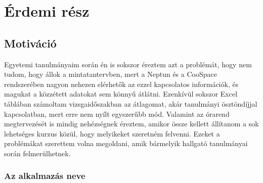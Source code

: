 \documentclass[a4paper,12pt]{report}
\begin{document}
\begin{abstract}
    [téma megnevezése]

    Célom egy olyan alkalmazás elkészítése volt, mely nagyban meg tudja könnyíteni az egyetemi hallgatók számára tanulmányaik követését mindennapjaik során. Ehhez az Angular nevű TypeScript keretrendszert választottam, mert ideálisnak tartom nagy alkalmazások elkészítéséhez, melyek sok, jól elkülöníthető részre tagozódnak, és összetett adatfolyamokkal dolgoznak. Ezen kívül hangsúlyt fektettem rá, hogy ne csak a Szegedi Tudományegyetem hallgatóira szabjam az alkalmazást, hanem általánossá tegyem, hogy az egész országban, de akár potenciálisan külföldön is használható legyen egyetemi hallgatók számára.
    
    Az elkészült Apollo nevű alkalmazás véleményem szerint sikeresen kielégíti ezeket az igényeket, és több egyetemi hallgató ismerősöm is megerősítette ezt.

    \textbf{Kulcsszavak:} webalkalmazás, egyetem, hallgató, Angular
\end{abstract}

\newpage

\pagebreak

\tableofcontents
\pagebreak

\chapter{Érdemi rész}

\section{Motiváció}

Egyetemi tanulmányaim során én is sokszor éreztem azt a problémát, hogy nem tudom, hogy állok a mintatantervben, mert a Neptun és a CooSpace rendszerében nagyon nehezen elérhetők az ezzel kapcsolatos információk, és magukat a közzétett adatokat sem könnyű átlátni. Ezenkívül sokszor Excel táblában számoltam vizsgaidőszakban az átlagomat, akár tanulmányi ösztöndíjjal kapcsolatban, mert erre nem nyílt egyszerűbb mód. Valamint az órarend megtervezését is mindig nehézségnek éreztem, amikor össze kellett állítanom a sok lehetséges kurzus közül, hogy melyikeket szeretném felvenni. Ezeket a problémákat szerettem volna megoldani, amik bármelyik hallgató tanulmányai során felmerülhetnek.

\subsection{Az alkalmazás neve}
\end{document}
